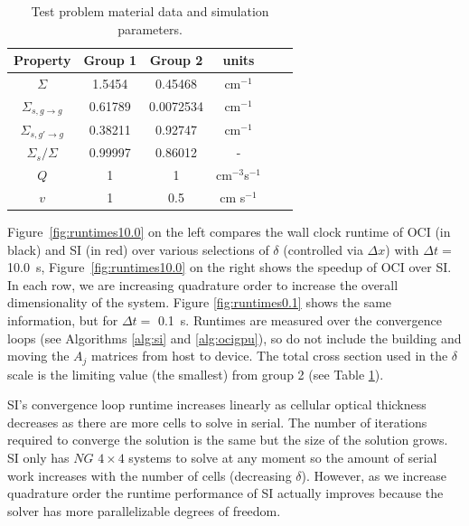\begin{table}
  \centering
  \begin{tabular}{@{}c c c c c c@{}} \toprule
    Property & Group 1 & Group 2 & units \\ \midrule
    $\Sigma$ & 1.5454 &  0.45468 & cm$^{-1}$  \\
    $\Sigma_{s,g\rightarrow g}$  & 0.61789 &  0.0072534 & cm$^{-1}$  \\
    $\Sigma_{s,g'\rightarrow g}$  & 0.38211 &  0.92747 & cm$^{-1}$ \\
    $\Sigma_s/\Sigma$ & 0.99997 & 0.86012 & - \\
    $Q$ & 1 & 1 & cm$^{-3}$s$^{-1}$\\
    $v$ & 1 & 0.5 & cm s$^{-1}$ \\
    \bottomrule
  \end{tabular}
  \caption{Test problem material data and simulation parameters.}
  \label{table:rosa_test} 
\end{table}

Figure~\ref{fig:runtimes10.0} on the left compares the wall clock runtime of OCI (in black) and SI (in red) over various selections of $\delta$ (controlled via $\Delta x$) with $\Delta t=$ \SI{10.0}{\s}, Figure~\ref{fig:runtimes10.0} on the right shows the speedup of OCI over SI.
In each row, we are increasing quadrature order to increase the overall dimensionality of the system.
Figure \ref{fig:runtimes0.1} shows the same information, but for $\Delta t=$ \SI{0.1}{\s}.
Runtimes are measured over the convergence loops (see Algorithms \ref{alg:si} and \ref{alg:ocigpu}), so do not include the building and moving the $A_j$ matrices from host to device.
The total cross section used in the $\delta$ scale is the limiting value (the smallest) from group 2 (see Table \ref{table:rosa_test}).

SI's convergence loop runtime increases linearly as cellular optical thickness decreases as there are more cells to solve  in serial.
The number of iterations required to converge the solution is the same but the size of the solution grows.
SI only has $NG$ $4\times4$ systems to solve at any moment so the amount of serial work increases with the number of cells (decreasing $\delta$).
However, as we increase quadrature order the runtime performance of SI actually improves because the solver has more parallelizable degrees of freedom.

